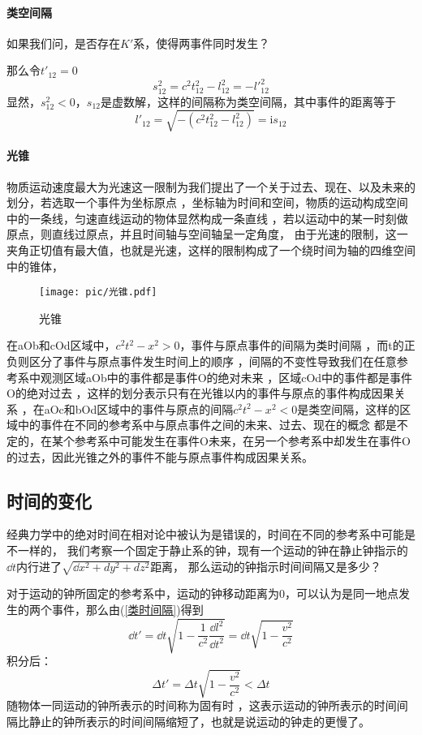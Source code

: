 \documentclass[12pt]{report}
\begin{document}
\paragraph{类空间隔}
如果我们问，是否存在$K'$系，使得两事件同时发生？

那么令${t'}_{12}=0$
$$s_{12}^2=c^2 t_{12}^2-l_{12}^2=-{l'}_{12}^2$$
显然，$s_{12}^2<0$，$s_{12}$是虚数解，这样的间隔称为类空间隔，其中事件的距离等于
\begin{equation}
    {l'}_{12}=\sqrt{-(c^2t_{12}^2-l_{12}^2)}=\mathrm{i}s_{12}
    \label{类空间隔}
\end{equation}

\paragraph{光锥}
物质运动速度最大为光速这一限制为我们提出了一个关于过去、现在、以及未来的划分，若选取一个事件为坐标原点
，坐标轴为时间和空间，物质的运动构成空间中的一条线，匀速直线运动的物体显然构成一条直线
，若以运动中的某一时刻做原点，则直线过原点，并且时间轴与空间轴呈一定角度，
由于光速的限制，这一夹角正切值有最大值，也就是光速，这样的限制构成了一个绕时间为轴的四维空间中的锥体，
\begin{figure}[ht]
    \centering
    \texttt{[image: pic/光锥.pdf]}
    \caption{\footnotesize 光锥}
\end{figure}
在aOb和cOd区域中，$c^2t^2-x^2>0$，事件与原点事件的间隔为类时间隔
，而t的正负则区分了事件与原点事件发生时间上的顺序
，间隔的不变性导致我们在任意参考系中观测区域aOb中的事件都是事件O的绝对未来
，区域cOd中的事件都是事件O的绝对过去
，这样的划分表示只有在光锥以内的事件与原点的事件构成因果关系
，在aOc和bOd区域中的事件与原点的间隔$c^2t^2-x^2<0$是类空间隔，这样的区域中的事件在不同的参考系中与原点事件之间的未来、过去、现在的概念
都是不定的，在某个参考系中可能发生在事件O未来，在另一个参考系中却发生在事件O的过去，因此光锥之外的事件不能与原点事件构成因果关系。

\subsection{时间的变化}
经典力学中的绝对时间在相对论中被认为是错误的，时间在不同的参考系中可能是不一样的，
我们考察一个固定于静止系的钟，现有一个运动的钟在静止钟指示的$\dd t$内行进了$\sqrt{\dd x^2+dy^2+dz^2}$距离，
那么运动的钟指示时间间隔又是多少？

对于运动的钟所固定的参考系中，运动的钟移动距离为0，可以认为是同一地点发生的两个事件，那么由(\ref{类时间隔})得到
\begin{equation}
    \dd {t'}=\dd t \sqrt{1-\frac{1}{c^2} \frac{\dd l^2}{\dd t^2}}=\dd t \sqrt{1-\frac{v^2}{c^2}}
\end{equation}
积分后：
\begin{equation}
    \Delta {t'}=\Delta t \sqrt{1-\frac{v^2}{c^2}} <\Delta t
\end{equation}
随物体一同运动的钟所表示的时间称为固有时
，这表示运动的钟所表示的时间间隔比静止的钟所表示的时间间隔缩短了，也就是说运动的钟走的更慢了。
\end{document}
